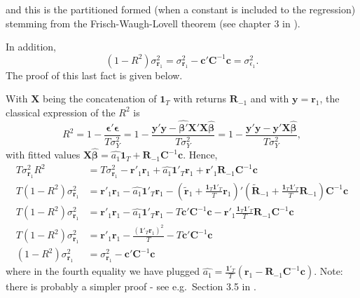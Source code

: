 \documentclass[]{krantz}
\theoremstyle{definition}
\theoremstyle{definition}
\theoremstyle{definition}
\theoremstyle{remark}
\begin{document}
and this is the partitioned formed (when a constant is included to the
regression) stemming from the Frisch-Waugh-Lovell theorem (see chapter 3
in \citet{greene2018econometric}).

In addition, \begin{equation}
\label{eq:sparse3}
(1-R^2)\sigma_{\mathbf{r}_1}^2=\sigma_{\mathbf{r}_1}^2- \mathbf{c}'\mathbf{C}^{-1}\mathbf{c} =\sigma^2_{\epsilon_1}.
\end{equation} The proof of this last fact is given below.

With \(\mathbf{X}\) being the concatenation of \(\mathbf{1}_T\) with
returns \(\mathbf{R}_{-1}\) and with \(\mathbf{y}=\mathbf{r}_1\), the
classical expression of the \(R^2\) is
\[R^2=1-\frac{\mathbf{\epsilon}'\mathbf{\epsilon}}{T\sigma_Y^2}=1-\frac{\mathbf{y}'\mathbf{y}-\hat{\mathbf{\beta}'}\mathbf{X}'\mathbf{X}\hat{\mathbf{\beta}}}{T\sigma_Y^2}=1-\frac{\mathbf{y}'\mathbf{y}-\mathbf{y}'\mathbf{X}\hat{\mathbf{\beta}}}{T\sigma_Y^2},\]
with fitted values
\(\mathbf{X}\hat{\mathbf{\beta}}= \hat{a_1}\mathbf{1}_T+\mathbf{R}_{-1}\mathbf{C}^{-1}\mathbf{c}\).
Hence, \begin{align*}
T\sigma_{\mathbf{r}_1}^2R^2&=T\sigma_{\mathbf{r}_1}^2-\mathbf{r}'_1\mathbf{r}_1+\hat{a_1}\mathbf{1}'_T\mathbf{r}_1+\mathbf{r}'_1\mathbf{R}_{-1}\mathbf{C}^{-1}\mathbf{c} \\
T(1-R^2)\sigma_{\mathbf{r}_1}^2&=\mathbf{r}'_1\mathbf{r}_1-\hat{a_1}\mathbf{1}'_T\mathbf{r}_1-\left(\mathbf{\tilde{r}}_1+\frac{\mathbf{1}_T\mathbf{1}'_T}{T}\mathbf{r}_1\right)'\left(\tilde{\mathbf{R}}_{-1}+\frac{\mathbf{1}_T\mathbf{1}'_T}{T}\mathbf{R}_{-1}\right)\mathbf{C}^{-1}\mathbf{c} \\
T(1-R^2)\sigma_{\mathbf{r}_1}^2&=\mathbf{r}'_1\mathbf{r}_1-\hat{a_1}\mathbf{1}'_T\mathbf{r}_1-T\mathbf{c}'\mathbf{C}^{-1}\mathbf{c} -\mathbf{r}'_1\frac{\mathbf{1}_T\mathbf{1}'_T}{T}\mathbf{R}_{-1} \mathbf{C}^{-1}\mathbf{c} \\
T(1-R^2)\sigma_{\mathbf{r}_1}^2&=\mathbf{r}'_1\mathbf{r}_1-\frac{(\mathbf{1}'_T\mathbf{r}_1)^2}{T}- T\mathbf{c}'\mathbf{C}^{-1}\mathbf{c} \\
(1-R^2)\sigma_{\mathbf{r}_1}^2&=\sigma_{\mathbf{r}_1}^2- \mathbf{c}'\mathbf{C}^{-1}\mathbf{c} 
\end{align*} where in the fourth equality we have plugged
\(\hat{a_1}=\frac{\mathbf{1'}_T}{T}(\mathbf{r}_1-\mathbf{R}_{-1}\mathbf{C}^{-1}\mathbf{c})\).
Note: there is probably a simpler proof - see e.g.~Section 3.5 in
\citet{greene2018econometric}.
\end{document}
